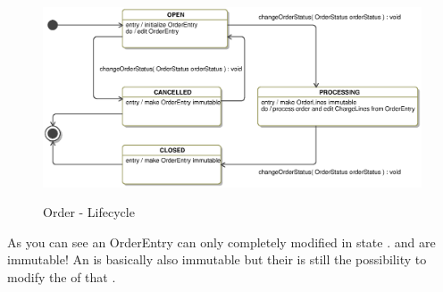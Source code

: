 \vskip 1cm
\begin{figure}[ht]
	\centering
  \includegraphics[scale =.7]{images/OrderEntryState.eps}
	\label{order_statemachine}
	\caption{Order - Lifecycle}
\end{figure}  

As you can see an OrderEntry can only completely modified in state .  and   are immutable! An   is basically also immutable but their is still the possibility to modify the  of that . 
